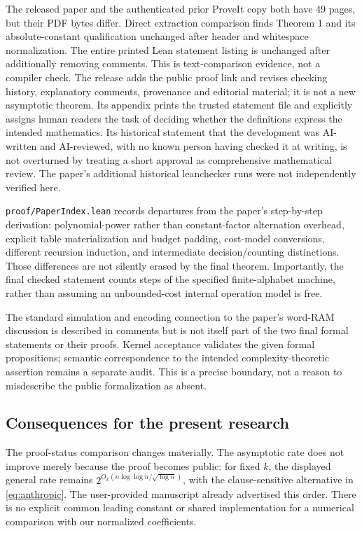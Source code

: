\documentclass[11pt,letterpaper]{article}
\theoremstyle{remark}\newtheorem{remark}[theorem]{Remark}
\begin{document}
The released paper and the authenticated prior ProveIt copy both have 49 pages, but their PDF bytes differ. Direct extraction comparison finds Theorem 1 and its absolute-constant qualification unchanged after header and whitespace normalization. The entire printed Lean statement listing is unchanged after additionally removing comments. This is text-comparison evidence, not a compiler check. The release adds the public proof link and revises checking history, explanatory comments, provenance and editorial material; it is not a new asymptotic theorem. Its appendix prints the trusted statement file and explicitly assigns human readers the task of deciding whether the definitions express the intended mathematics. Its historical statement that the development was AI-written and AI-reviewed, with no known person having checked it at writing, is not overturned by treating a short approval as comprehensive mathematical review. The paper's additional historical leanchecker runs were not independently verified here.

\texttt{proof/PaperIndex.lean} records departures from the paper's step-by-step derivation: polynomial-power rather than constant-factor alternation overhead, explicit table materialization and budget padding, cost-model conversions, different recursion induction, and intermediate decision/counting distinctions. Those differences are not silently erased by the final theorem. Importantly, the final checked statement counts steps of the specified finite-alphabet machine, rather than assuming an unbounded-cost internal operation model is free.

The standard simulation and encoding connection to the paper's word-RAM discussion is described in comments but is not itself part of the two final formal statements or their proofs. Kernel acceptance validates the given formal propositions; semantic correspondence to the intended complexity-theoretic assertion remains a separate audit. \cite{anthropicpaper,anthropicstatement} This is a precise boundary, not a reason to misdescribe the public formalization as absent.

\subsection{Consequences for the present research}
The proof-status comparison changes materially. The asymptotic rate does not improve merely because the proof becomes public: for fixed $k$, the displayed general rate remains $2^{O_k(n\log\log n/\sqrt{\log n})}$, with the clause-sensitive alternative in \eqref{eq:anthropic}. The user-provided manuscript already advertised this order. There is no explicit common leading constant or shared implementation for a numerical comparison with our normalized coefficients.
\end{document}
